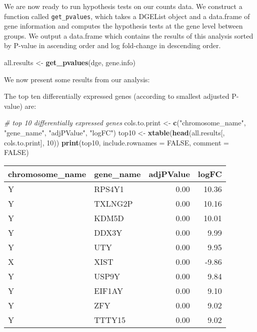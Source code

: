\documentclass[]{article}
\newenvironment{Shaded}{\begin{snugshade}}{\end{snugshade}}
\newcommand{\KeywordTok}[1]{\textcolor[rgb]{0.13,0.29,0.53}{\textbf{{#1}}}}
\newcommand{\DataTypeTok}[1]{\textcolor[rgb]{0.13,0.29,0.53}{{#1}}}
\newcommand{\DecValTok}[1]{\textcolor[rgb]{0.00,0.00,0.81}{{#1}}}
\newcommand{\StringTok}[1]{\textcolor[rgb]{0.31,0.60,0.02}{{#1}}}
\newcommand{\CommentTok}[1]{\textcolor[rgb]{0.56,0.35,0.01}{\textit{{#1}}}}
\newcommand{\OtherTok}[1]{\textcolor[rgb]{0.56,0.35,0.01}{{#1}}}
\newcommand{\NormalTok}[1]{{#1}}
\begin{document}
We are now ready to run hypothesis tests on our counts data. We
construct a function called \texttt{get\_pvalues}, which takes a DGEList
object and a data.frame of gene information and computes the hypothesis
tests at the gene level between groups. We output a data.frame which
contains the results of this analysis sorted by P-value in ascending
order and log fold-change in descending order.

\begin{Shaded}
\begin{Highlighting}[]
\NormalTok{all.results <-}\StringTok{ }\KeywordTok{get_pvalues}\NormalTok{(dge, gene.info)}
\end{Highlighting}
\end{Shaded}

We now present some results from our analysis:

The top ten differentially expressed genes (according to smallest
adjusted P-value) are:

\begin{Shaded}
\begin{Highlighting}[]
\CommentTok{# top 10 differentially expressed genes}
\NormalTok{cols.to.print <-}\StringTok{ }\KeywordTok{c}\NormalTok{(}\StringTok{"chromosome_name"}\NormalTok{, }\StringTok{"gene_name"}\NormalTok{, }\StringTok{"adjPValue"}\NormalTok{, }\StringTok{"logFC"}\NormalTok{)}
\NormalTok{top10 <-}\StringTok{ }\KeywordTok{xtable}\NormalTok{(}\KeywordTok{head}\NormalTok{(all.results[, cols.to.print], }\DecValTok{10}\NormalTok{))}
\KeywordTok{print}\NormalTok{(top10, }\DataTypeTok{include.rownames =} \OtherTok{FALSE}\NormalTok{, }\DataTypeTok{comment =} \OtherTok{FALSE}\NormalTok{)}
\end{Highlighting}
\end{Shaded}

\begin{table}[ht]
\centering
\begin{tabular}{llrr}
  \hline
chromosome\_name & gene\_name & adjPValue & logFC \\ 
  \hline
Y & RPS4Y1 & 0.00 & 10.36 \\ 
  Y & TXLNG2P & 0.00 & 10.16 \\ 
  Y & KDM5D & 0.00 & 10.01 \\ 
  Y & DDX3Y & 0.00 & 9.99 \\ 
  Y & UTY & 0.00 & 9.95 \\ 
  X & XIST & 0.00 & -9.86 \\ 
  Y & USP9Y & 0.00 & 9.84 \\ 
  Y & EIF1AY & 0.00 & 9.10 \\ 
  Y & ZFY & 0.00 & 9.02 \\ 
  Y & TTTY15 & 0.00 & 9.02 \\ 
   \hline
\end{tabular}
\end{table}
\end{document}
